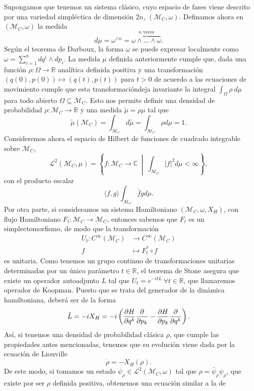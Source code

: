\documentclass[openany, 11pt]{book}
\numberwithin{equation}{chapter}
\newcommand{\Mc}{\mathcal M_C}
\begin{document}
Supongamos que tenemos un sistema clásico, cuyo espacio de fases viene descrito por una variedad simpléctica de dimensión 2$n$, $(\Mc, \omega)$. 
Definamos ahora en $(\Mc, \omega)$ la medida \begin{equation}
    d\mu = \omega^{\wedge n} = \overbrace{\omega \wedge ... \wedge \omega }^{n \text{ veces}}.
\end{equation}Según el teorema de Darboux, la forma $\omega$ se puede expresar localmente como $\omega = \sum_{i=1}^n dq^i \wedge dp_i$. La medida $\mu$ definida anteriormente 
cumple que, dada una función $\rho:\Omega \to \mathbb R$ analítica definida positiva y una transformación $(q(0), p(0)) \mapsto (q(t), p(t))$ para $t>0$ de acuerdo a las ecuaciones de 
movimiento cumple que esta transformacióndeja invariante la integral $\int_\Omega \rho \ d\mu$ para todo abierto $\Omega \subseteq \Mc$. Esto nos permite definir una densidad de probabilidad
$\rho : \Mc \to \mathbb R$ y una medida $\tilde \mu = \rho \mu$ tal que \begin{equation}
    \tilde \mu (\Mc) = \int_{\Mc} d\tilde\mu = \int_{\Mc} \rho d\mu = 1.
\end{equation}Consideremos ahora el espacio de Hilbert de funciones de cuadrado integrable sobre $\Mc$, \begin{equation}
    \mathcal L^2(\Mc, \mu) = \left\{f:\Mc \to \mathbb C \ \middle | \ \int_{\Mc}|f|^2 d\mu <\infty\right\},
\end{equation}con el producto escalar \begin{equation}
    \langle f, g \rangle \int_{\Mc} \bar f gd\mu.
\end{equation}Por otra parte, si consideramos un sistema Hamiltoniano $(\Mc, \omega, X_H)$, con flujo Hamiltoniano $F_t :\Mc \to\Mc$, entonces sabemos que $F_t$ es un simplectomorfismo, de modo 
que la transformación \begin{equation} \begin{aligned}
    U_t: C^\infty(\Mc) &\to C^\infty(\Mc) \\ f &\mapsto F_t^*\circ f\end{aligned}
\end{equation}es unitaria. Como tenemos un grupo continuo de transformaciones unitarias determinadas por un único 
parámetro $t\in\mathbb R$, el teorema de Stone asegura que existe un operador autoadjunto $L$ tal que $U_t = e^{-itL} \ \forall t\in\mathbb R$, que llamaremos operador de Koopman. 
Puesto que se trata del generador de la dinámica hamiltoniana, deberá ser de la forma \begin{equation}
    \hat L = -iX_H = -i\left(\pdv{H}{q^k}\pdv{p_k}-\pdv{H}{p_k}\pdv{q^k}\right).
\end{equation}Así, si tenemos una densidad de probabilidad clásica $\rho$, que cumple las propiedades antes mencionadas, tenemos que su evolución viene dada por la ecuación de Liouville\begin{equation}
    \dot \rho = -X_H(\rho).
\end{equation}De este modo, si tomamos un estado $\psi_\rho\in\mathcal L^2(\Mc,\omega)$ tal que $\rho = \bar \psi_\rho \psi_\rho$, que existe por ser $\rho$ definida positiva, obtenemos una ecuación similar a la de 
\end{document}
